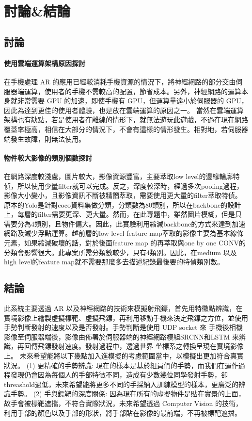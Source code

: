 \chapter{討論&結論}
\section{討論}
\subsubsection{使用雲端運算架構原因探討}
在手機處理 AR 的應用已經較消耗手機資源的情況下，將神經網路的部分交由伺服器端運算，使用者的手機不需較高的配置，節省成本。另外，神經網路的運算本身就非常需要 GPU 的加速，即使手機有 GPU，但運算量遠小於伺服器的 GPU，因此為達到更佳的使用者體驗，也是放在雲端運算的原因之一。
當然在雲端運算架構也有缺點，若是使用者在離線的情形下，就無法遊玩此遊戲，不過在現在網路覆蓋率極高，相信在大部分的情況下，不會有這樣的情形發生。相對地，若伺服器端發生故障，則無法使用。
\subsubsection{物件較大影像的類別個數探討}
在網路深度較淺處，圖片較大，影像資源豐富，主要萃取low level的邊緣輪廓特偵，所以使用少量filter就可以完成。反之，深度較深時，經過多次pooling過程，影像大小變小，且影像資訊不斷被精餾萃取，需要使用更大量的filter萃取特偵。原本的Yolo是針對coco資料集做分類，分類數為80類別，所以在backbone的設計上，每層的filter需要更深、更大量。然而，在此專題中，雖然圖片模糊，但是只需要分為4類別，且物件偏大。因此，此實驗利用縮減backbone的方式來達到加速網路及減少浮點運算。越前層的low level feature map萃取的影像主要為基本線條元素，如果縮減破壞的話，對於後面feature map 的再萃取與one by one CONV的分類會影響很大。此專案所需分類數較少，只有4類別。因此，在medium 以及high level的feature map就不需要那麼多去描述紀錄最後要的特偵類別數。

\section{結論}
此系統主要透過 AR 以及神經網路的技術來模擬射飛鏢，首先用特徵點辨識，在實境影像上繪製虛擬標靶、虛擬飛鏢，再利用移動手機來決定飛鏢之方位，並使用手勢判斷發射的速度以及是否發射。手勢判斷是使用 UDP socket 來
手機後相機影像至伺服器端後，影像由佈署於伺服器端的神經網路模組SRCNN和LSTM 來辨識，再回傳飛鏢發射速度。發射過程中，透過世界
坐標系之轉換呈現在實境影像上。
未來希望能將以下幾點加入進模擬的考慮範圍當中，以模擬出更加符合真實狀況。
(1) 更精確的手勢辨識: 現在的樣本是基於組員們的手勢，而我們在運作過程發現仍會因為每個人的手部特徵不同，造成有少數幾位同學發射手勢，卻threashold過低，未來希望能將更多不同的手採納入訓練模型的樣本，更廣泛的辨識手勢。
(2) 手與鏢靶的深度關係: 因為現在所有的虛擬物件是貼在實景的上面，故手會被標靶遮擋，不符合實際狀況，未來希望透過 Computer Vision 的技術，利用手部的顏色以及手部的形狀，將手部貼在影像的最前端，不再被標靶遮擋。